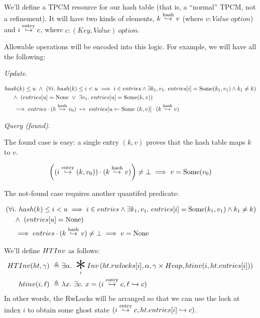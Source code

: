 \documentclass{article}
\newcommand{\BigAsterisk}{\mathop{\scalebox{3}{\raisebox{-0.2ex}{$\ast$}}}}%
\renewcommand{\eqdef}{\triangleq}
\newcommand{\pointsto}{\hookrightarrow}
\begin{document}
\newpage

We'll define a TPCM resource for our hash table (that is, a ``normal'' TPCM, not a refinement). It will have two kinds of elements, $k \stackrel{\text{hash}}{\hookrightarrow} v$ (where $v : Value~option$)
and $i \stackrel{\text{entry}}{\hookrightarrow} c$, where $c : (Key,Value)~option$.

Allowable operations will be encoded into this logic. For example, we will have all the following:

\emph{Update}.

\begin{align*}
  &hash(k) \le u ~\land~ \left(\forall i.~ hash(k) \le i < u \implies i \in entries \land \exists k_1,v_1 .~ entries[i] = \text{Some} (k_1,v_1) \land k_1 \ne k\right)\\
  &~~~~\land~ \left(entries[u] = \text{None} ~\lor~ \exists v_1 .~ entries[u] = \text{Some} (k, v) \right)\\
  &~~~~\implies entries \cdot (k \stackrel{\text{hash}}{\hookrightarrow} v_0) ~\mapsto~ entries[u \leftarrow \text{Some}~(k,v)]  \cdot (k \stackrel{\text{hash}}{\hookrightarrow} v)
\end{align*}

\emph{Query (found)}.

The found case is easy: a single entry $(k,v)$ proves that the hash table maps $k$ to $v$.

\[
  \left((i \stackrel{\text{entry}}{\hookrightarrow} (k,v_0)) \cdot (k \stackrel{\text{hash}}{\hookrightarrow} v)\right) \ne \bot \implies v = \text{Some}(v_0)
\]

The not-found case requires another quantifed predicate:

\begin{align*}
&\left(\forall i.~ hash(k) \le i < u \implies i \in entries \land \exists k_1,v_1 .~ entries[i] = \text{Some} (k_1,v_1) \land k_1 \ne k\right)\\
  &~~~~\land~ \left(entries[u] = \text{None}\right)\\
  &~~~~\implies entries \cdot (k \stackrel{\text{hash}}{\hookrightarrow} v) \ne \bot \implies v = \text{None}
\end{align*}

We'll define $HTInv$ as follows:
\begin{align*}
\HTInv(ht, \gamma) ~\eqdef~& \exists\alpha.~ \BigAsterisk_i \Inv\left(ht.rwlocks[i], \alpha, \gamma\times\Heap, \htinv(i, ht.entries[i])\right)\\
\htinv(i, \ell) ~\eqdef~& \lambda x .~ \exists c .~ x = (i \entryto c, \ell \pointsto c)
\end{align*}
In other words, the RwLocks will be arranged so that we can use the lock at index $i$ to obtain
some ghost state $(i \entryto c, ht.entries[i] \pointsto c)$.
\end{document}
